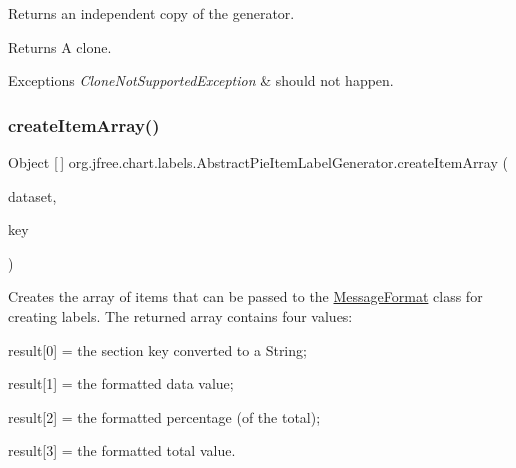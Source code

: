 Returns an independent copy of the generator.

\begin{DoxyReturn}{Returns}
A clone.
\end{DoxyReturn}

\begin{DoxyExceptions}{Exceptions}
{\em Clone\+Not\+Supported\+Exception} & should not happen. \\
\hline
\end{DoxyExceptions}
\mbox{\label{classorg_1_1jfree_1_1chart_1_1labels_1_1_abstract_pie_item_label_generator_a4e8f2f699263b772b5713cf290ed5814}} 
\subsubsection{\texorpdfstring{create\+Item\+Array()}{createItemArray()}}
{\footnotesize\ttfamily Object \mbox{[}$\,$\mbox{]} org.\+jfree.\+chart.\+labels.\+Abstract\+Pie\+Item\+Label\+Generator.\+create\+Item\+Array (\begin{DoxyParamCaption}\item[{\mbox{\hyperlink{interfaceorg_1_1jfree_1_1data_1_1general_1_1_pie_dataset}{Pie\+Dataset}}}]{dataset,  }\item[{Comparable}]{key }\end{DoxyParamCaption})\hspace{0.3cm}{\ttfamily [protected]}}

Creates the array of items that can be passed to the \mbox{\hyperlink{}{Message\+Format}} class for creating labels. The returned array contains four values\+: 
\begin{DoxyItemize}
\item result\mbox{[}0\mbox{]} = the section key converted to a {\ttfamily String}; 
\item result\mbox{[}1\mbox{]} = the formatted data value; 
\item result\mbox{[}2\mbox{]} = the formatted percentage (of the total); 
\item result\mbox{[}3\mbox{]} = the formatted total value. 
\end{DoxyItemize}


